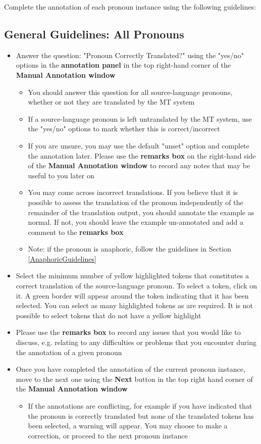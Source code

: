 \documentclass[11pt]{article} %
\begin{document}
Complete the annotation of each pronoun instance using the following guidelines:


\subsection{General Guidelines: All Pronouns}

\begin{itemize}
  \item Answer the question: "Pronoun Correctly Translated?" using the "yes/no" options in the \textbf{annotation panel} in the top right-hand corner of the \textbf{Manual Annotation window}
  \begin{itemize}
    \item You should answer this question for all source-language pronouns, whether or not they are translated by the MT system
    \item If a source-language pronoun is left untranslated by the MT system, use the "yes/no" options to mark whether this is correct/incorrect
    \item If you are unsure, you may use the default "unset" option and complete the annotation later. Please use the \textbf{remarks box} on the right-hand side of the \textbf{Manual Annotation window} to record any notes that may be useful to you later on
    \item You may come across incorrect translations. If you believe that it is possible to assess the translation of the pronoun independently of the remainder of the translation output, you should annotate the example as normal. If not, you should leave the example un-annotated and add a comment to the \textbf{remarks box}
    \item Note: if the pronoun is anaphoric, follow the guidelines in Section \ref{AnaphoricGuidelines}
  \end{itemize}
  \item Select the minimum number of yellow highlighted tokens that constitutes a correct translation of the source-language pronoun. To select a token, click on it. A green border will appear around the token indicating that it has been selected. You can select as many highlighted tokens as are required. It is not possible to select tokens that do not have a yellow highlight
  \item Please use the \textbf{remarks box} to record any issues that you would like to discuss, e.g. relating to any difficulties or problems that you encounter during the annotation of a given pronoun
  \item Once you have completed the annotation of the current pronoun instance, move to the next one using the \textbf{Next} button in the top right hand corner of the \textbf{Manual Annotation window}
  \begin{itemize}
    \item If the annotations are conflicting, for example if you have indicated that the pronoun is correctly translated but none of the translated tokens has been selected, a warning will appear. You may choose to make a correction, or proceed to the next pronoun instance
  \end{itemize}
\end{itemize}
\end{document}
